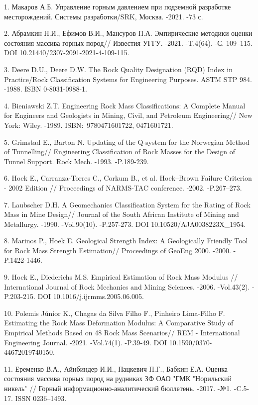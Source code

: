 \begin{refs}
1. Макаров А.Б. Управление горным давлением при подземной
разработке месторождений. Системы разработки/SRK, Москва. -2021. -73
с.

2. Абрамкин Н.И., Ефимов В.И., Мансуров П.А. Эмпирические методики оценки
состояния массива горных пород// Известия УГГУ. -2021. -T.4(64). -С.
109--115. DOI 10.21440/2307-2091-2021-4-109-115.

3. Deere D.U., Deere D.W. The Rock Quality Designation (RQD) Index in
Practice/Rock Classification Systems for Engineering Purposes. ASTM
STP 984. -1988. ISBN 0-8031-0988-1.

4. Bieniawski Z.T. Engineering Rock Mass Classifications: A Complete
Manual for Engineers and Geologists in Mining, Civil, and Petroleum
Engineering// New York: Wiley. -1989. ISBN:~9780471601722, 0471601721.

5. Grimstad E., Barton N. Updating of the Q-system for the Norwegian
Method of Tunnelling// Engineering Classification of Rock Masses for
the Design of Tunnel Support. Rock Mech. -1993. -P.189-239.

6. Hoek E., Carranza-Torres C., Corkum B., et al. Hoek--Brown Failure
Criterion - 2002 Edition // Proceedings of NARMS-TAC conference.
-2002. -P.267--273.

7. Laubscher D.H. A Geomechanics Classification System for the Rating of
Rock Mass in Mine Design// Journal of the South African Institute of
Mining and Metallurgy. -1990. -Vol.90(10). -P.257-273. DOI
10.10520/AJA0038223X\_1954.

8. Marinos P., Hoek E. Geological Strength Index: A Geologically Friendly
Tool for Rock Mass Strength Estimation// Proceedings of GeoEng 2000.
-2000. -P.1422-1446.

9. Hoek E., Diederichs M.S. Empirical Estimation of Rock Mass Modulus //
International Journal of Rock Mechanics and Mining Sciences. -2006.
-Vol.43(2). -P.203-215. DOI 10.1016/j.ijrmms.2005.06.005.

10. Polemis Júnior K., Chagas da Silva Filho F., Pinheiro Lima-Filho F.
Estimating the Rock Mass Deformation Modulus: A Comparative Study of
Empirical Methods Based on 48 Rock Mass Scenarios// REM - International
Engineering Journal. -2021. -Vol.74(1). -P.39-49. DOI
10.1590/0370-44672019740150.

11. Еременко В.А., Айнбиндер И.И., Пацкевич П.Г., Бабкин Е.А. Оценка
состояния массива горных пород на рудниках ЗФ ОАО "ГМК "Норильский
никель" // Горный информационно-аналитический бюллетень. -2017. -№1.
-C.5-17. ISSN 0236--1493.


\end{refs}

